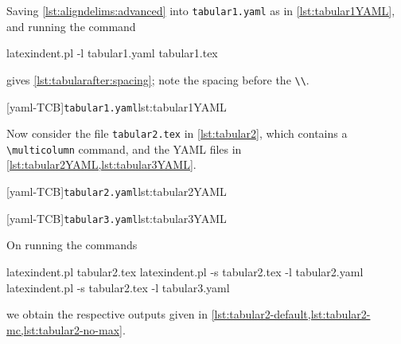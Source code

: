 	\begin{minipage}{.45\textwidth}
	\end{minipage}%
	\hfill
	\begin{minipage}{.45\textwidth}
	\end{minipage}%

	Saving \cref{lst:aligndelims:advanced} into \texttt{tabular1.yaml} as in \cref{lst:tabular1YAML}, and running the command
	\begin{commandshell}
latexindent.pl -l tabular1.yaml tabular1.tex 
\end{commandshell}
	gives \cref{lst:tabularafter:spacing}; note the spacing before the \lstinline!\\!.

	\begin{minipage}{.45\textwidth}
	\end{minipage}%
	\hfill
	\begin{minipage}{.54\textwidth}
		[yaml-TCB]{\texttt{tabular1.yaml}}{lst:tabular1YAML}
	\end{minipage}%

	Now consider the file \texttt{tabular2.tex} in \cref{lst:tabular2}, which contains a \lstinline!\multicolumn! command, and
	the YAML files in \cref{lst:tabular2YAML,lst:tabular3YAML}.

	\begin{minipage}{.45\textwidth}
		[yaml-TCB]{\texttt{tabular2.yaml}}{lst:tabular2YAML}
	\end{minipage}%
	\hfill
	\begin{minipage}{.45\textwidth}
		[yaml-TCB]{\texttt{tabular3.yaml}}{lst:tabular3YAML}
	\end{minipage}%

	On running the commands
	\begin{commandshell}
latexindent.pl tabular2.tex 
latexindent.pl -s tabular2.tex -l tabular2.yaml
latexindent.pl -s tabular2.tex -l tabular3.yaml
        \end{commandshell}
	we obtain the respective outputs given in \cref{lst:tabular2-default,lst:tabular2-mc,lst:tabular2-no-max}.

